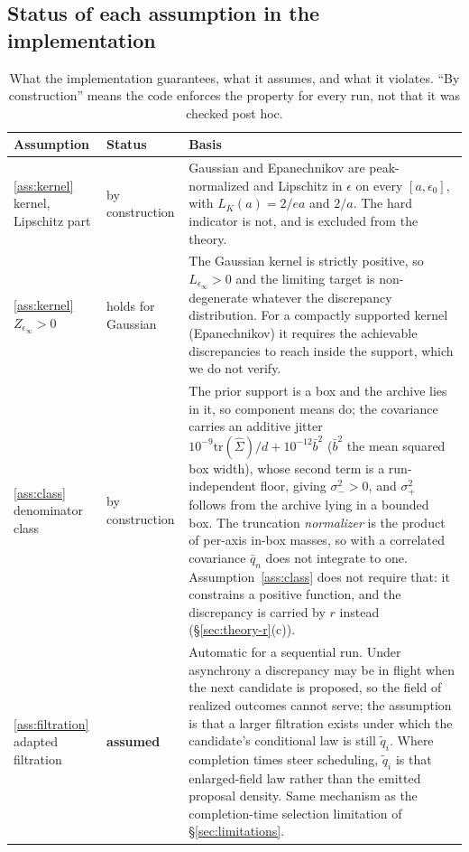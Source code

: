 \documentclass[pdflatex,sn-mathphys-num]{sn-jnl}
\theoremstyle{plain}
\theoremstyle{definition}
\begin{document}
\begin{appendices}
\subsection{Status of each assumption in the implementation}\label{app:theory-status}
\begin{table}[h]
\caption{What the implementation guarantees, what it assumes, and what it violates. ``By construction'' means the code enforces the property for every run, not that it was checked post hoc.}\label{tab:assumption-status}
\centering
\footnotesize
\setlength{\tabcolsep}{3pt}
\begin{tabular}{@{}p{}p{}p{}@{}}
\toprule
Assumption & Status & Basis \\
\midrule
\ref{ass:kernel} kernel, Lipschitz part & by construction & Gaussian and Epanechnikov are peak-normalized and Lipschitz in $\epsilon$ on every $[a,\epsilon_0]$, with $L_K(a)=2/ea$ and $2/a$. The hard indicator is not, and is excluded from the theory. \\
\ref{ass:kernel} $Z_{\epsilon_\infty}>0$ & holds for Gaussian & The Gaussian kernel is strictly positive, so $L_{\epsilon_\infty}>0$ and the limiting target is non-degenerate whatever the discrepancy distribution. For a compactly supported kernel (Epanechnikov) it requires the achievable discrepancies to reach inside the support, which we do not verify. \\
\ref{ass:class} denominator class & by construction & The prior support is a box and the archive lies in it, so component means do; the covariance carries an additive jitter $10^{-9}\mathrm{tr}(\widehat\Sigma)/d+10^{-12}\bar b^2$ ($\bar b^2$ the mean squared box width), whose second term is a run-independent floor, giving $\sigma_-^2>0$, and $\sigma_+^2$ follows from the archive lying in a bounded box. The truncation \emph{normalizer} is the product of per-axis in-box masses, so with a correlated covariance $\bar q_n$ does not integrate to one. Assumption~\ref{ass:class} does not require that: it constrains a positive function, and the discrepancy is carried by $r$ instead (\S\ref{sec:theory-r}(c)). \\
\ref{ass:filtration} adapted filtration & \textbf{assumed} & Automatic for a sequential run. Under asynchrony a discrepancy may be in flight when the next candidate is proposed, so the field of realized outcomes cannot serve; the assumption is that a larger filtration exists under which the candidate's conditional law is still $\tilde q_i$. Where completion times steer scheduling, $\tilde q_i$ is that enlarged-field law rather than the emitted proposal density. Same mechanism as the completion-time selection limitation of \S\ref{sec:limitations}. \\

\end{tabular}
\end{table}
\end{appendices}
\end{document}
